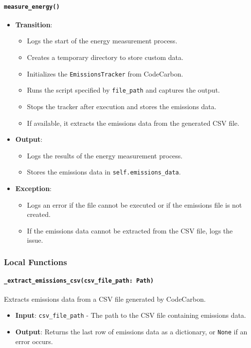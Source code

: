 \documentclass[12pt, titlepage]{article}
\begin{document}
\paragraph{\texttt{measure\_energy()}}
\begin{itemize}
  \item \textbf{Transition}:
    \begin{itemize}
      \item Logs the start of the energy measurement process.
      \item Creates a temporary directory to store custom data.
      \item Initializes the \texttt{EmissionsTracker} from CodeCarbon.
      \item Runs the script specified by \texttt{file\_path} and captures the output.
      \item Stops the tracker after execution and stores the emissions data.
      \item If available, it extracts the emissions data from the generated CSV file.
    \end{itemize}
  \item \textbf{Output}: 
    \begin{itemize}
        \item Logs the results of the energy measurement process.
        \item Stores the emissions data in \texttt{self.emissions\_data}.
    \end{itemize}
   \item \textbf{Exception}: 
      \begin{itemize}
        \item Logs an error if the file cannot be executed or if the emissions file is not created.
        \item If the emissions data cannot be extracted from the CSV file, logs the issue.
      \end{itemize}
 \end{itemize}

\subsubsection{Local Functions}
\paragraph{\texttt{\_extract\_emissions\_csv(csv\_file\_path: Path)}}
    
    Extracts emissions data from a CSV file generated by CodeCarbon.
    \begin{itemize}
        \item \textbf{Input}: \texttt{csv\_file\_path} - The path to the CSV file containing emissions data.
        \item \textbf{Output}: Returns the last row of emissions data as a dictionary, or \texttt{None} if an error occurs.
    \end{itemize}
\end{document}
